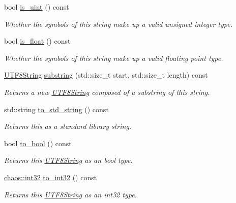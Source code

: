 \begin{DoxyCompactItemize}
bool \hyperlink{classchaos_1_1uni_1_1_u_t_f8_string_a0df001bc19b6ee2a9e843f88b82dbfe1}{is\+\_\+uint} () const 
\begin{DoxyCompactList}\small\item\em Whether the symbols of this string make up a valid unsigned integer type. \end{DoxyCompactList}\item 
bool \hyperlink{classchaos_1_1uni_1_1_u_t_f8_string_abc0b60f3ca6eff7782dc0e6a363ca919}{is\+\_\+float} () const 
\begin{DoxyCompactList}\small\item\em Whether the symbols of this string make up a valid floating point type. \end{DoxyCompactList}\item 
\hyperlink{classchaos_1_1uni_1_1_u_t_f8_string}{U\+T\+F8\+String} \hyperlink{classchaos_1_1uni_1_1_u_t_f8_string_a6a92e0b096b7d0087e3c784fa7f891aa}{substring} (std\+::size\+\_\+t start, std\+::size\+\_\+t length) const 
\begin{DoxyCompactList}\small\item\em Returns a new \hyperlink{classchaos_1_1uni_1_1_u_t_f8_string}{U\+T\+F8\+String} composed of a substring of this string. \end{DoxyCompactList}\item 
std\+::string \hyperlink{classchaos_1_1uni_1_1_u_t_f8_string_adbb12ac0c1ae8e1cb84b55cd8300fa55}{to\+\_\+std\+\_\+string} () const 
\begin{DoxyCompactList}\small\item\em Returns this as a standard library string. \end{DoxyCompactList}\item 
bool \hyperlink{classchaos_1_1uni_1_1_u_t_f8_string_a5c49dc0272b3eae0bb585b5f6ba03ad7}{to\+\_\+bool} () const 
\begin{DoxyCompactList}\small\item\em Returns this \hyperlink{classchaos_1_1uni_1_1_u_t_f8_string}{U\+T\+F8\+String} as an bool type. \end{DoxyCompactList}\item 
\hyperlink{namespacechaos_aba819cd899114dc5873e32e7b26411c4}{chaos\+::int32} \hyperlink{classchaos_1_1uni_1_1_u_t_f8_string_a743209e7c71e08c370267ae10b473ce0}{to\+\_\+int32} () const 
\begin{DoxyCompactList}\small\item\em Returns this \hyperlink{classchaos_1_1uni_1_1_u_t_f8_string}{U\+T\+F8\+String} as an int32 type. \end{DoxyCompactList}\item 

\end{DoxyCompactItemize}
